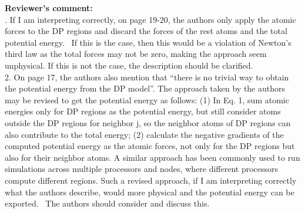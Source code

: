 \documentclass[doublespace,prb,aps,preprint]{revtex4}
\newenvironment{Comment}{ {\bf \indent Reviewer's comment: \\} \setlength{\parindent}{1cm}  \sffamily }{ \ignorespacesafterend \\}
\begin{document}
\begin{Comment}
1.  If I am interpreting correctly, on page 19-20, the authors only apply the atomic forces to the DP regions and discard the forces of the rest atoms and the total potential energy.  
If this is the case, then this would be a violation of Newton's third law as the total forces may not be zero, making the approach seem unphysical. 
If this is not the case, the description should be clarified.\\
2. On page 17, the authors also mention that “there is no trivial way to obtain the potential energy from the DP model”. 
The approach taken by the authors may be revised to get the potential energy as follows: 
(1) In Eq. 1, sum atomic energies only for DP regions as the potential energy, but still consider atoms outside the DP regions for neighbor j, so the neighbor atoms of DP regions can also contribute to the total energy; 
(2) calculate the negative gradients of the computed potential energy as the atomic forces, not only for the DP regions but also for their neighbor atoms. 
A similar approach has been commonly used to run simulations across multiple processors and nodes, 
where different processors compute different regions. 
Such a revised approach, if I am interpreting correctly what the authors describe, would more physical and the potential energy can be exported.  
The authors should consider and discuss this.
\end{Comment}
\end{document}
